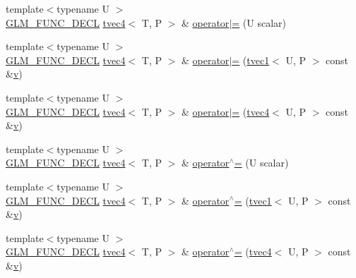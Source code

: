 \begin{DoxyCompactItemize}
\item 
{\footnotesize template$<$typename U $>$ }\\\mbox{\hyperlink{setup_8hpp_ab2d052de21a70539923e9bcbf6e83a51}{G\+L\+M\+\_\+\+F\+U\+N\+C\+\_\+\+D\+E\+CL}} \mbox{\hyperlink{structglm_1_1tvec4}{tvec4}}$<$ T, P $>$ \& \mbox{\hyperlink{structglm_1_1tvec4_ad25c16e99c736f476341ce104743ea33}{operator$\vert$=}} (U scalar)
\item 
{\footnotesize template$<$typename U $>$ }\\\mbox{\hyperlink{setup_8hpp_ab2d052de21a70539923e9bcbf6e83a51}{G\+L\+M\+\_\+\+F\+U\+N\+C\+\_\+\+D\+E\+CL}} \mbox{\hyperlink{structglm_1_1tvec4}{tvec4}}$<$ T, P $>$ \& \mbox{\hyperlink{structglm_1_1tvec4_a33c3ccecaa070fbab0ad4d3857ab084d}{operator$\vert$=}} (\mbox{\hyperlink{structglm_1_1tvec1}{tvec1}}$<$ U, P $>$ const \&\mbox{\hyperlink{glad_8h_a14cfbe2fc2234f5504618905b69d1e06}{v}})
\item 
{\footnotesize template$<$typename U $>$ }\\\mbox{\hyperlink{setup_8hpp_ab2d052de21a70539923e9bcbf6e83a51}{G\+L\+M\+\_\+\+F\+U\+N\+C\+\_\+\+D\+E\+CL}} \mbox{\hyperlink{structglm_1_1tvec4}{tvec4}}$<$ T, P $>$ \& \mbox{\hyperlink{structglm_1_1tvec4_acf72e48733651ac92f61ed70fe339a37}{operator$\vert$=}} (\mbox{\hyperlink{structglm_1_1tvec4}{tvec4}}$<$ U, P $>$ const \&\mbox{\hyperlink{glad_8h_a14cfbe2fc2234f5504618905b69d1e06}{v}})
\item 
{\footnotesize template$<$typename U $>$ }\\\mbox{\hyperlink{setup_8hpp_ab2d052de21a70539923e9bcbf6e83a51}{G\+L\+M\+\_\+\+F\+U\+N\+C\+\_\+\+D\+E\+CL}} \mbox{\hyperlink{structglm_1_1tvec4}{tvec4}}$<$ T, P $>$ \& \mbox{\hyperlink{structglm_1_1tvec4_a4e3c9f658334363b354a9d6865ad35d7}{operator$^\wedge$=}} (U scalar)
\item 
{\footnotesize template$<$typename U $>$ }\\\mbox{\hyperlink{setup_8hpp_ab2d052de21a70539923e9bcbf6e83a51}{G\+L\+M\+\_\+\+F\+U\+N\+C\+\_\+\+D\+E\+CL}} \mbox{\hyperlink{structglm_1_1tvec4}{tvec4}}$<$ T, P $>$ \& \mbox{\hyperlink{structglm_1_1tvec4_a44b9249aabc9ae280d826ffe16b4b0dc}{operator$^\wedge$=}} (\mbox{\hyperlink{structglm_1_1tvec1}{tvec1}}$<$ U, P $>$ const \&\mbox{\hyperlink{glad_8h_a14cfbe2fc2234f5504618905b69d1e06}{v}})
\item 
{\footnotesize template$<$typename U $>$ }\\\mbox{\hyperlink{setup_8hpp_ab2d052de21a70539923e9bcbf6e83a51}{G\+L\+M\+\_\+\+F\+U\+N\+C\+\_\+\+D\+E\+CL}} \mbox{\hyperlink{structglm_1_1tvec4}{tvec4}}$<$ T, P $>$ \& \mbox{\hyperlink{structglm_1_1tvec4_a9945b7771ada85b3324781679d9282f5}{operator$^\wedge$=}} (\mbox{\hyperlink{structglm_1_1tvec4}{tvec4}}$<$ U, P $>$ const \&\mbox{\hyperlink{glad_8h_a14cfbe2fc2234f5504618905b69d1e06}{v}})

\end{DoxyCompactItemize}
